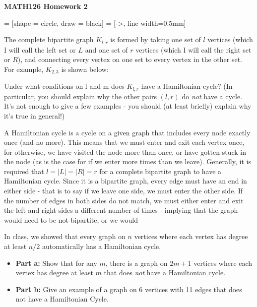\documentclass{article}
\begin{document}
\centerline{\large \bf MATH126 Homework 2}

\vskip 0.15in

 = [shape = circle, draw = black]
 = [->, line width=0.5mm]
\begin{problem} The complete bipartite graph $K_{l,r}$ is formed by taking one set of $l$ vertices (which I will call the left set or $L$ and one set of $r$ vertices (which I will call the right set or $R$), and connecting every vertex on one set to every vertex in the other set.  For example, $K_{2,3}$ is shown below:
\vskip 0.15in \noindent
{}
\vskip 0.15in \noindent
Under what conditions on l and m does $K_{l,r}$ have a Hamiltonian cycle? (In particular, you should explain why the other pairs $(l,r)$ do \emph{not} have a cycle. It's not enough to give a few examples - you should (at least briefly) explain why it's true in general!)
\end{problem}

\begin{solution} A Hamiltonian cycle is a cycle on a given graph that includes every node exactly once (and no more).  This means that we must enter and exit each vertex once, for otherwise, we have visited the node more than once, or have gotten stuck in the node (as is the case for if we enter more times than we leave).  Generally, it is required that $l=|L|=|R|=r$ for a complete bipartite graph to have a Hamiltonian cycle.  Since it is a bipartite graph, every edge must have an end in either side - that is to say if we leave one side, we must enter the other side.  If the number of edges in both sides do not match, we must either enter and exit the left and right sides a different number of times - implying that the graph would need to be not bipartite, or we would 
\end{solution}


\begin{problem} In class, we showed that every graph on $n$ vertices where each vertex has degree at least $n/2$ automatically has a Hamiltonian cycle.
\begin{itemize}
	\item[]{\textbf{Part a:}} Show that for any $m$, there is a graph on $2m+1$ vertices where each vertex has degree at least $m$ that does \emph{not} have a Hamiltonian cycle.
	\item[]{\textbf{Part b:}} Give an example of a graph on 6 vertices with 11 edges that does not have a Hamiltonian Cycle.
\end{itemize}
\end{problem}
\end{document}
